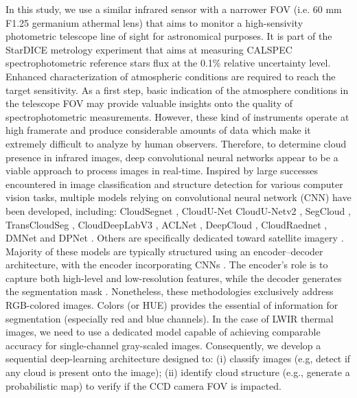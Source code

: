 \documentclass{article}
\begin{document}
In this study, we use a similar infrared sensor with a narrower FOV (i.e. 60 mm F1.25 germanium athermal lens) that aims to monitor a high-sensivity photometric telescope line of sight for astronomical purposes. It is part of the StarDICE metrology experiment \citep{stardice1} that aims at measuring CALSPEC \citep{Bohlin2014} spectrophotometric reference stars flux at the 0.1\% relative uncertainty level. Enhanced characterization of atmospheric conditions are required to reach the target sensitivity. As a first step, basic indication of the atmosphere conditions in the telescope FOV may provide valuable insights onto the quality of spectrophotometric measurements. However, these kind of instruments operate at high framerate and produce considerable amounts of data which make it extremely difficult to analyze by human observers. Therefore, to determine cloud presence in infrared images, deep convolutional neural networks appear to be a viable approach to process images in real-time. Inspired by large successes encountered in image classification and structure detection for various computer vision tasks, multiple models relying on convolutional neural network (CNN) have been developed, including: CloudSegnet \citep{dev2019cloudsegnet}, CloudU-Net \citep{CloudUNet} CloudU-Netv2 \citep{CloudUNetv2}, SegCloud \citep{SegCloud}, TransCloudSeg \citep{TransCloudSeg}, CloudDeepLabV3 \citep{CloudDeepLabV3}, ACLNet \citep{makwana2022aclnet}, DeepCloud \citep{DeepCloud}, CloudRaednet \citep{shi2022cloudraednet}, DMNet \citep{DMNet} and DPNet \cite{DPNet}.
Others are specifically dedicated toward satellite imagery \cite{kanu2020cloudx, chen2023novel}. Majority of these models are typically structured using an encoder–decoder architecture, with the encoder incorporating CNNs \citep{oshea2015introduction}. The encoder's role is to capture both high-level and low-resolution features, while the decoder generates the segmentation mask \citep{badrinarayanan2017segnet, Alzubaidi2021ReviewOD}. Nonetheless, these methodologies exclusively address RGB-colored images. Colors (or HUE) provides the essential of information for segmentation (especially red and blue channels). In the case of LWIR thermal images, we need to use a dedicated model capable of achieving comparable accuracy for single-channel gray-scaled images. Consequently, we develop a sequential deep-learning architecture designed to: (i) classify images (e.g, detect if any cloud is present onto the image); (ii) identify cloud structure (e.g., generate a probabilistic map) to verify if the CCD camera FOV is impacted.
\end{document}
